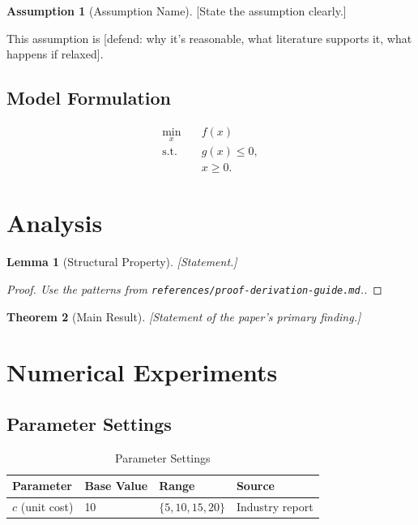 \documentclass[12pt,letterpaper]{article}
\newtheorem{theorem}{Theorem}[section]
\newtheorem{lemma}[theorem]{Lemma}
\theoremstyle{definition}
\newtheorem{assumption}{Assumption}[section]
\begin{document}
\begin{assumption}[Assumption Name]
\label{ass:example}
[State the assumption clearly.]
\end{assumption}

This assumption is [defend: why it's reasonable, what literature supports it, what happens if relaxed].

\subsection{Model Formulation}

\begin{align}
\min_{x} \quad & f(x) \label{eq:obj}\\
\text{s.t.} \quad & g(x) \leq 0, \label{eq:constraints}\\
& x \geq 0. \nonumber
\end{align}

\section{Analysis}

\begin{lemma}[Structural Property]
\label{lem:example}
[Statement.]
\end{lemma}

\begin{proof}
[Proof. Use the patterns from \texttt{references/proof-derivation-guide.md}.]
\end{proof}

\begin{theorem}[Main Result]
\label{thm:main}
[Statement of the paper's primary finding.]
\end{theorem}

\section{Numerical Experiments}

\subsection{Parameter Settings}

\begin{table}[htbp]
\centering
\caption{Parameter Settings}
\begin{tabular}{@{}llll@{}}
\toprule
\textbf{Parameter} & \textbf{Base Value} & \textbf{Range} & \textbf{Source} \\
\midrule
$c$ (unit cost) & 10 & $\{5, 10, 15, 20\}$ & Industry report \\
\bottomrule
\end{tabular}
\end{table}
\end{document}
